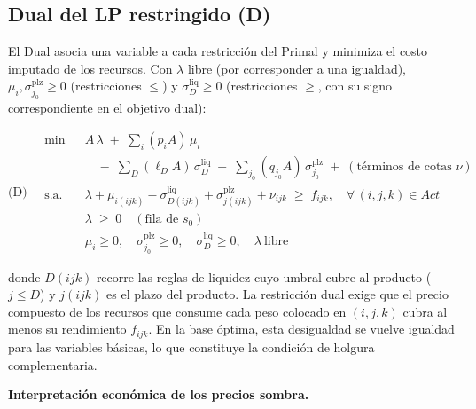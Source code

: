 \documentclass[11pt,a4paper]{article}
\begin{document}
\subsection{Dual del LP restringido (D)}

El Dual asocia una variable a cada restricción del Primal y minimiza el costo imputado de los recursos. Con $\lambda$ libre (por corresponder a una igualdad), $\mu_i, \sigma^{\text{plz}}_{j_0} \ge 0$ (restricciones $\le$) y $\sigma^{\text{liq}}_D \ge 0$ (restricciones $\ge$, con su signo correspondiente en el objetivo dual):

\[
\text{(D)}\quad
\begin{aligned}
\min\ \ & A\,\lambda \;+\; \sum_{i} (p_i A)\,\mu_i \\[2pt]
        & \quad -\; \sum_{D} (\ell_D A)\,\sigma^{\text{liq}}_D \;+\; \sum_{j_0} (q_{j_0} A)\,\sigma^{\text{plz}}_{j_0} \;+\; (\text{términos de cotas } \nu) \\[4pt]
\text{s.a.}\quad
& \lambda + \mu_{i(ijk)} - \sigma^{\text{liq}}_{D(ijk)} + \sigma^{\text{plz}}_{j(ijk)} + \nu_{ijk} \;\ge\; f_{ijk}, \quad \forall\, (i,j,k)\in Act \\
& \lambda \;\ge\; 0 \quad (\text{fila de } s_0) \\
& \mu_i \ge 0,\quad \sigma^{\text{plz}}_{j_0} \ge 0,\quad \sigma^{\text{liq}}_D \ge 0,\quad \lambda\ \text{libre}
\end{aligned}
\]

donde $D(ijk)$ recorre las reglas de liquidez cuyo umbral cubre al producto ($j \le D$) y $j(ijk)$ es el plazo del producto. La restricción dual exige que el precio compuesto de los recursos que consume cada peso colocado en $(i, j, k)$ cubra al menos su rendimiento $f_{ijk}$. En la base óptima, esta desigualdad se vuelve igualdad para las variables básicas, lo que constituye la condición de holgura complementaria.

\textbf{Interpretación económica de los precios sombra.}
\end{document}

